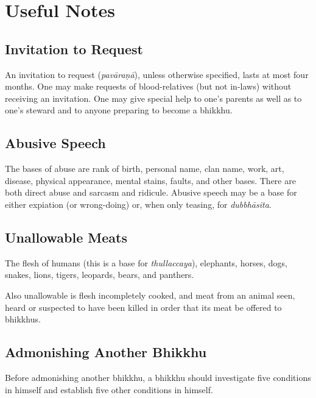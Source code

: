 \chapter{Useful Notes}

\section{Invitation to Request}

An invitation to request (\emph{pavāraṇā}), unless otherwise specified, lasts at
most four months. One may make requests of blood-relatives (but not in-laws)
without receiving an invitation. One may give special help to one's parents as
well as to one's steward and to anyone preparing to become a bhikkhu.


\section{Abusive Speech}

The bases of abuse are rank of birth, personal name, clan name, work, art,
disease, physical appearance, mental stains, faults, and other bases. There are
both direct abuse and sarcasm and ridicule. Abusive speech may be a base for
either expiation (or wrong-doing) or, when only teasing, for \emph{dubbhāsita}.


\section{Unallowable Meats}

The flesh of humans (this is a base for \emph{thullaccaya}), elephants, horses,
dogs, snakes, lions, tigers, leopards, bears, and panthers.


Also unallowable is flesh incompletely cooked, and meat from an animal seen,
heard or suspected to have been killed in order that its meat be offered to
bhikkhus.


\section{Admonishing Another Bhikkhu}

Before admonishing another bhikkhu, a bhikkhu should investigate five conditions
in himself and establish five other conditions in himself.

